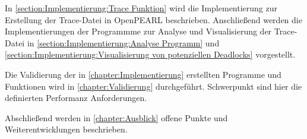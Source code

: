 In \cref{section:Implementierung:Trace Funktion} wird die Implementierung zur
Erstellung der Trace-Datei in OpenPEARL beschrieben. Anschließend werden die
Implementierungen der Programmme zur Analyse und Visualisierung der Trace-Datei
in \cref{section:Implementierung:Analyse Programm} und
\cref{section:Implementierung:Visualisierung von potenziellen Deadlocks}
vorgestellt.

Die Validierung der in \cref{chapter:Implementierung} erstellten Programme und
Funktionen wird in \cref{chapter:Validierung} durchgeführt. Schwerpunkt sind
hier die definierten Performanz Anforderungen.

Abschließend werden in \cref{chapter:Ausblick} offene Punkte und
Weiterentwicklungen beschrieben.